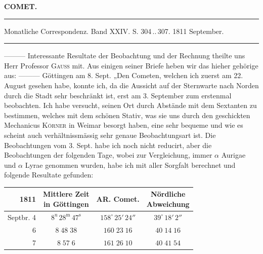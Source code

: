 \clearpage{}\hypertarget{native-340-lower}{}\label{native-340-lower}
\begin{center}\textbf{COMET.}\par\vspace{4pt}\hrule\vspace{4pt}\fontsize{10}{12}\selectfont Monatliche Correspondenz. Band XXIV. S. 304\,..\,307. 1811 September.\par\vspace{4pt}\hrule\vspace{4pt}\end{center}

\par\indent ---\;---\;--- Interessante Resultate der Beobachtung und der Rechnung theilte uns Herr Professor \textsc{Gauss} mit. Aus einigen seiner Briefe heben wir das hieher gehörige aus: ---\;---\;--- Göttingen am 8. Sept. „Den Cometen, welchen ich zuerst am 22. August gesehen habe, konnte ich, da die Aussicht auf der Sternwarte nach Norden durch die Stadt sehr beschränkt ist, erst am 3. September zum erstenmal beobachten. Ich habe versucht, seinen Ort durch Abstände mit dem Sextanten zu bestimmen, welches mit dem schönen Stativ, was sie uns durch den geschickten Mechanicus \textsc{Körner} in Weimar besorgt haben, eine sehr bequeme und wie es scheint auch verhältnissmässig sehr genaue Beobachtungsart ist. Die Beobachtungen vom 3. Sept. habe ich noch nicht reducirt, aber die Beobachtungen der folgenden Tage, wobei zur Vergleichung, immer $\alpha$ Aurigae und $\alpha$ Lyrae genommen wurden, habe ich mit aller Sorgfalt berechnet und folgende Resultate gefunden:
\begin{center}\fontsize{10}{12}\selectfont\setlength{\tabcolsep}{4pt}\renewcommand{\arraystretch}{1.15}\begin{tabular}{r|c|c|c}
1811 & \shortstack{Mittlere Zeit\\in Göttingen} & AR. Comet. & \shortstack{Nördliche\\Abweichung}\\\hline
Septbr. 4 & $8^{\mathrm u}\,28^{\mathrm m}\,47^{\mathrm s}$ & $158^\circ\,25'\,24''$ & $39^\circ\,18'\,2''$\\
6 & $8\;48\;38$ & $160\;23\;16$ & $40\;14\;16$\\
7 & $8\;57\;6$ & $161\;26\;10$ & $40\;41\;54$\\
\end{tabular}\end{center}

